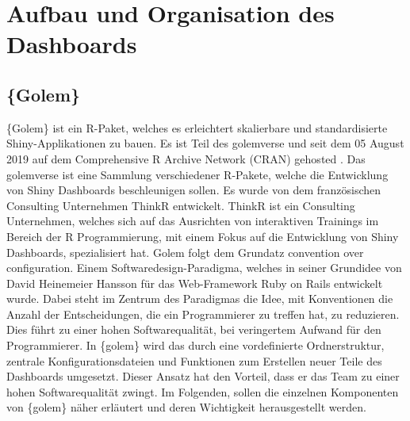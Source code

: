 \section{Aufbau und Organisation des Dashboards}

\subsection{\{Golem\}}\label{chap:Golem}
\{Golem\} ist ein R-Paket, welches es erleichtert skalierbare und standardisierte Shiny-Applikationen zu bauen. Es ist Teil des golemverse und seit dem 05 August 2019 auf dem \glqq Comprehensive R Archive Network\grqq{} (CRAN)  gehosted \citep{ThinkR2019}.\newline
Das golemverse \citep{ThinkRnodate} ist eine Sammlung verschiedener R-Pakete, welche die Entwicklung von Shiny Dashboards beschleunigen sollen. Es wurde von dem französischen Consulting Unternehmen ThinkR \citep{Breizhtormnodate} entwickelt.\newline
ThinkR ist ein Consulting Unternehmen, welches sich auf das Ausrichten von interaktiven Trainings im Bereich der R Programmierung, mit einem Fokus auf die Entwicklung von Shiny Dashboards, spezialisiert hat. \newline
{Golem} folgt dem Grundatz \glqq convention over configuration\grqq{}. 
Einem Softwaredesign-Paradigma, welches in seiner Grundidee von David Heinemeier Hansson \citep{Hansson2016} für das Web-Framework \glqq Ruby on Rails\grqq{} entwickelt wurde. Dabei steht im Zentrum des Paradigmas die Idee, mit Konventionen die Anzahl der Entscheidungen, die ein Programmierer zu treffen hat, zu reduzieren. Dies führt zu einer hohen Softwarequalität, bei veringertem Aufwand für den Programmierer. \newline
In \{golem\} wird das durch eine vordefinierte Ordnerstruktur, zentrale Konfigurationsdateien und Funktionen zum Erstellen neuer Teile des Dashboards umgesetzt. \newline 
Dieser Ansatz hat den Vorteil, dass er das Team zu einer hohen Softwarequalität zwingt. \newline 
Im Folgenden, sollen die einzelnen Komponenten von \{golem\} näher erläutert und deren Wichtigkeit herausgestellt werden.


